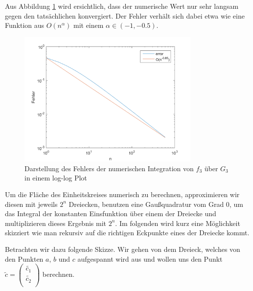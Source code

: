 \documentclass[a4paper,11pt,bibliography=totoc,listof=totoc,headinclude=true,cleardoublepage=empty,oneside]{scrbook}
\begin{document}
Aus Abbildung \ref{fig:3_5_3} wird ersichtlich, dass der numerische Wert nur sehr langsam gegen den tatsächlichen konvergiert. Der Fehler verhält sich dabei etwa wie eine Funktion aus $O(n^\alpha)$ mit einem $\alpha \in (-1,-0.5)$. 
	
\begin{figure}[h]
	\centering
	\includegraphics[width=0.8\textwidth]{plot_3_5_3.png}
	\caption{Darstellung des Fehlers der numerischen Integration von $f_3$ über $G_3$ in einem log-log Plot}
	\label{fig:3_5_3}
\end{figure}
	

\pagebreak Um die Fläche des Einheitskreises numerisch zu berechnen, approximieren wir diesen mit jeweils $2^n$ Dreiecken, benutzen eine Gaußquadratur vom Grad 0, um das Integral der  konstanten Einsfunktion über einem der Dreiecke und multiplizieren dieses Ergebnis mit $2^n$. Im folgenden wird kurz eine Möglichkeit skizziert wie man rekursiv auf die richtigen Eckpunkte eines der Dreiecke kommt.

\noindent Betrachten wir dazu folgende Skizze. Wir gehen von dem Dreieck, welches von den Punkten $a$, $b$ und $c$ aufgespannt wird aus und wollen uns den Punkt $\tilde{c} = \left(\begin{array}{ccc}
	\tilde{c_1} \\
	\tilde{c_2}\\
\end{array}\right)$ berechnen.

\vspace{14mm}
\hspace{2.7cm}
\\
\end{document}
